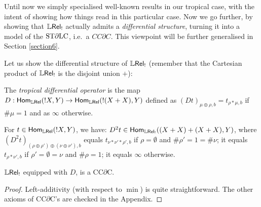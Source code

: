 Until now we simply specialised well-known results in our tropical case, with the intent of showing how things read in this particular case.
Now we go further, by showing that $\mathbb{L} \mathsf{Rel}_!$ actually admits a \emph{differential structure}, turning it into a model of the $\mathrm{ST}\partial\mathrm{LC}$, i.e.~a $CC\partial C$.
This viewpoint
will be further generalised in Section \ref{section6}.

%
%

Let us show the differential structure of $\mathbb{L} \mathsf{Rel}_!$ (remember that the Cartesian product of $\mathbb{L} \mathsf{Rel}_!$ is the disjoint union $+$): 

\begin{definition}
 The \emph{tropical differential operator} is the map $D:\mathsf{Hom}_{\mathbb{L} \mathsf{Rel}}(!X,Y)\to \mathsf{Hom}_{\mathbb{L} \mathsf{Rel}}(!(X+X),Y)$ defined as $(Dt)_{\mu\oplus\rho,b}=t_{\rho*\mu,b}$ if $\#\mu=1$ and as $\infty$ otherwise.
\end{definition}

\begin{remark}
For $t\in\mathsf{Hom}_{\mathbb{L} \mathsf{Rel}}(!X,Y)$, we have:
 $D^2 t\in\mathsf{Hom}_{\mathbb{L} \mathsf{Rel}_!}((X+X)+(X+X),Y)$, where $(D^2 t)_{(\rho\oplus\rho')\oplus(\nu\oplus\nu'),b}$ equals $t_{\nu*\nu'*\rho',b}$ if $\rho=\emptyset$ and $\#\rho'=1=\#\nu$; it equals $t_{\rho*\nu',b}$ if $\rho'=\emptyset=\nu$ and $\#\rho=1$; it equals $\infty$ otherwise.
\end{remark}

\begin{theorem}\label{thm:LREL!CCDC}
 $\mathbb{L} \mathsf{Rel}_!$ equipped with $D$, is a CC$\partial$C.
\end{theorem}
\begin{proof}
 Left-additivity (with respect to $\min$) is quite straightforward.
 The other axioms of CC$\partial$C's are checked in the Appendix.
\end{proof}

